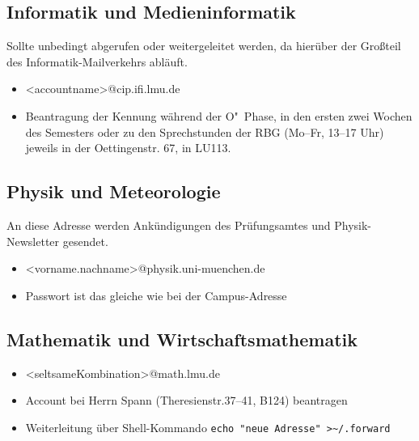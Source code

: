 \subsection*{Informatik und Medieninformatik \subjectList{\subjectI\subjectMI}}
Sollte unbedingt abgerufen oder weitergeleitet werden, da hierüber der Großteil des Informatik-Mailverkehrs abläuft. 
\begin{itemize}
	\item <accountname>@cip.ifi.lmu.de
	\item Beantragung der Kennung während der O"~Phase, in den ersten zwei Wochen des Semesters oder zu den Sprechstunden der RBG 
		(Mo--Fr, 13--17 Uhr) jeweils in der Oettingenstr. 67, in LU113.
\end{itemize}
\begin{urlList}
\end{urlList}

\subsection*{Physik und Meteorologie\subjectList{\subjectP}}
An diese Adresse werden Ankündigungen des Prüfungsamtes und
Physik-Newsletter gesendet.
\begin{itemize}
	\item <vorname.nachname>@physik.uni-muenchen.de
	\item Passwort ist das gleiche wie bei der Campus-Adresse
\end{itemize}
\begin{urlList}
\end{urlList}

\subsection*{Mathematik und Wirtschaftsmathematik\subjectList{\subjectM\subjectW}}
\begin{itemize}
	\item <seltsameKombination>@math.lmu.de
	\item Account bei Herrn Spann (Theresienstr.37--41, B124) beantragen
	\item Weiterleitung über Shell-Kommando \verb|echo "neue Adresse" >~/.forward|
\end{itemize}

